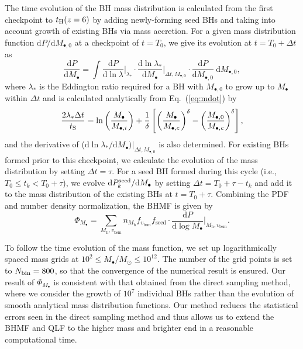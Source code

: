 \documentclass[twocolumn, twocolappendix]{aastex63}
\newcommand{\Msun}{M_\odot}
\newcommand{\Mh}{M_\mathrm{h}}
\newcommand{\Mbh}{M_\bullet}
\newcommand{\vbsm}{v_\mathrm{bsm}}
\newcommand{\tlife}{\tau}
\newcommand{\fseed}{f_\mathrm{seed}}
\newcommand{\D}{\mathrm{d}}
\begin{document}
\begin{CJK*}{UTF8}{gbsn}
The time evolution of the BH mass distribution is calculated from the first checkpoint to $t_{\rm H}(z=6)$ by adding newly-forming seed BHs
and taking into account growth of existing BHs via mass accretion.
For a given mass distribution function $\D P/\D  M_{\bullet, 0}$ at a checkpoint of $t=T_0$, 
we give its evolution at $t=T_0+\Delta t$ as
%
\begin{equation}
  \label{eq:dpdm}
  \frac{\D P}{\D \Mbh} = \int
   \frac{\D P}{\D \ln \lambda}\Big|_{\lambda_\ast} \cdot
   \frac{\D \ln \lambda_\ast}{\D  \Mbh}\Big|_{\Delta t, M_{\bullet,0}} \cdot
  \frac{\D P}{\D M_{\bullet, 0}}~\D M_{\bullet, 0},
\end{equation}
%
where $\lambda_\ast$ is the Eddington ratio required for a BH with $M_{\bullet,0}$ to grow up to $\Mbh$ within $\Delta t$
and is calculated analytically from Eq.~(\ref{eq:mdot}) by
%
\begin{equation}
  \label{eq:mi2m}
\frac{2 \lambda_\ast \Delta t}{t_{\rm S}}=
  \ln \left(\frac{\Mbh} {M_{\bullet,i}}\right) + \frac{1}{\delta} 
  \left[ \left(\frac{\Mbh}{M_{\bullet,c}}\right)^\delta - \left(\frac{M_{\bullet, 0}}{M_{\bullet,c}}\right)^\delta \right],
\end{equation}
%
and the derivative of ($\D \ln \lambda_\ast / \D  \Mbh )|_{\Delta t, M_{\bullet,0}}$ is also determined.
For existing BHs formed prior to this checkpoint, we calculate the evolution of the mass distribution by setting $\Delta t = \tlife$.
For a seed BH formed during this cycle (i.e., $T_0\leq t_k < T_0+\tlife$), 
we evolve $\D P^{\rm seed}_k/\D \Mbh$ by setting $\Delta t = T_0+\tlife -t_k$ and add it to the mass distribution 
of the existing BHs at $t=T_0+\tlife$.
Combining the PDF and number density normalization, the BHMF is given by
%
\begin{equation}
  \Phi_{\Mbh} 
  =\sum_{\Mh, \vbsm} n_{\Mh} f_{\vbsm} {\fseed} \cdot \frac{\D P}{\D \log \Mbh}\Big|_{\Mh, \vbsm}.
 \end{equation}


To follow the time evolution of the mass function, we set up 
logarithmically spaced mass grids at $10^2 \leq \Mbh /\Msun \leq 10^{12}$.
The number of the grid points is set to $N_{\rm bin}=800$, so that the convergence of the numerical result is ensured.
Our result of $\Phi_{\Mbh}$ is consistent with that obtained from the direct sampling method, where 
we consider the growth of $10^7$ individual BHs rather than the evolution of smooth analytical mass distribution functions.
Our method reduces the statistical errors seen in the direct sampling method 
and thus allows us to extend the BHMF and QLF to the higher mass and brighter end
in a reasonable computational time.




\end{CJK*}
\end{document}
